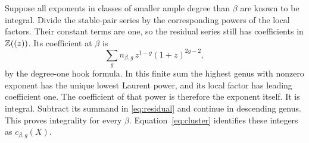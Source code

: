 Suppose all exponents in classes of smaller ample degree than
$\beta$ are known to be integral. Divide the stable-pair series by
the corresponding powers of the local factors. Their constant
terms are one, so the residual series still has coefficients in
$\mathbb Z((z))$. Its coefficient at $\beta$ is
\begin{equation}\label{eq:residual}
 \sum_g n_{\beta,g}\,z^{1-g}(1+z)^{2g-2},
\end{equation}
by the degree-one hook formula. In this finite sum the highest
genus with nonzero exponent has the unique lowest Laurent power,
and its local factor has leading coefficient one. The coefficient
of that power is therefore the exponent itself. It is integral.
Subtract its summand in \eqref{eq:residual} and continue in
descending genus. This proves integrality for every $\beta$.
Equation~\eqref{eq:cluster} identifies these integers as
$c_{\beta,g}(X)$.
